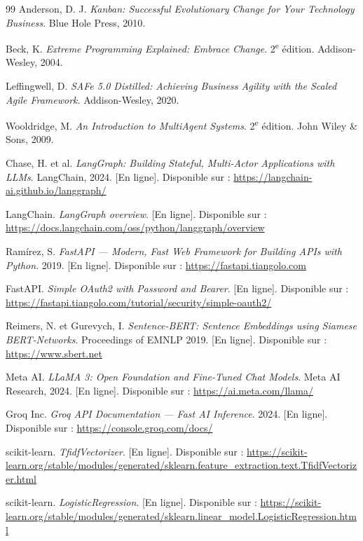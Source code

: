 \documentclass[12pt,a4paper]{report}
\begin{document}
\begin{thebibliography}{99}
Anderson, D. J. \textit{Kanban: Successful Evolutionary Change for Your Technology Business}. Blue Hole Press, 2010.

Beck, K. \textit{Extreme Programming Explained: Embrace Change}. 2\textsuperscript{e} édition. Addison-Wesley, 2004.

Leffingwell, D. \textit{SAFe 5.0 Distilled: Achieving Business Agility with the Scaled Agile Framework}. Addison-Wesley, 2020.

Wooldridge, M. \textit{An Introduction to MultiAgent Systems}. 2\textsuperscript{e} édition. John Wiley \& Sons, 2009.

Chase, H. et al. \textit{LangGraph: Building Stateful, Multi-Actor Applications with LLMs}. LangChain, 2024. [En ligne]. Disponible sur : \url{https://langchain-ai.github.io/langgraph/}

LangChain. \textit{LangGraph overview}. [En ligne]. Disponible sur : \url{https://docs.langchain.com/oss/python/langgraph/overview}

Ramírez, S. \textit{FastAPI --- Modern, Fast Web Framework for Building APIs with Python}. 2019. [En ligne]. Disponible sur : \url{https://fastapi.tiangolo.com}

FastAPI. \textit{Simple OAuth2 with Password and Bearer}. [En ligne]. Disponible sur : \url{https://fastapi.tiangolo.com/tutorial/security/simple-oauth2/}

Reimers, N. et Gurevych, I. \textit{Sentence-BERT: Sentence Embeddings using Siamese BERT-Networks}. Proceedings of EMNLP 2019. [En ligne]. Disponible sur : \url{https://www.sbert.net}

Meta AI. \textit{LLaMA 3: Open Foundation and Fine-Tuned Chat Models}. Meta AI Research, 2024. [En ligne]. Disponible sur : \url{https://ai.meta.com/llama/}

Groq Inc. \textit{Groq API Documentation --- Fast AI Inference}. 2024. [En ligne]. Disponible sur : \url{https://console.groq.com/docs/}

scikit-learn. \textit{TfidfVectorizer}. [En ligne]. Disponible sur : \url{https://scikit-learn.org/stable/modules/generated/sklearn.feature_extraction.text.TfidfVectorizer.html}

scikit-learn. \textit{LogisticRegression}. [En ligne]. Disponible sur : \url{https://scikit-learn.org/stable/modules/generated/sklearn.linear_model.LogisticRegression.html}


\end{thebibliography}
\end{document}
